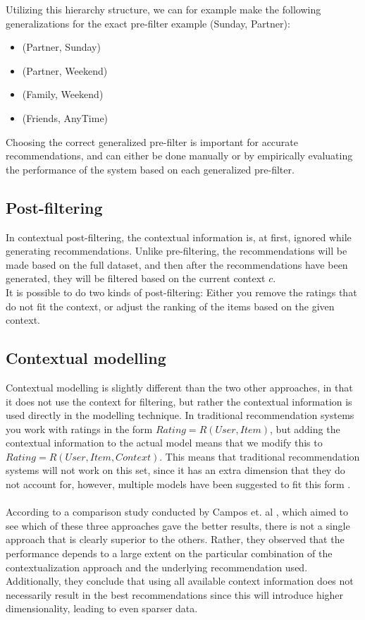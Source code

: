 Utilizing this hierarchy structure, we can for example make the following generalizations for the exact pre-filter example (Sunday, Partner):
\begin{itemize}
	\item (Partner, Sunday)
	\item (Partner, Weekend)
	\item (Family, Weekend)
	\item (Friends, AnyTime)
\end{itemize}

Choosing the correct generalized pre-filter is important for accurate recommendations, and can either be done manually or by empirically evaluating the performance of the system based on each generalized pre-filter.

\subsection*{Post-filtering}
In contextual post-filtering, the contextual information is, at first, ignored while generating recommendations.
Unlike pre-filtering, the recommendations will be made based on the full dataset, and then after the recommendations have been generated, they will be filtered based on the current context $c$.\\
It is possible to do two kinds of post-filtering: Either you remove the ratings that do not fit the context, or adjust the ranking of the items based on the given context.

\subsection*{Contextual modelling}
Contextual modelling is slightly different than the two other approaches, in that it does not use the context for filtering, but rather the contextual information is used directly in the modelling technique.
In traditional recommendation systems you work with ratings in the form $Rating = R(User, Item)$, but adding the contextual information to the actual model means that we modify this to $Rating = R(User, Item, Context)$.
This means that traditional recommendation systems will not work on this set, since it has an extra dimension that they do not account for, however, multiple models have been suggested to fit this form \cite{Adomavicius2011}.\\\\

According to a comparison study conducted by Campos et. al \cite{10.1007/978-3-642-39878-0_13}, which aimed to see which of these three approaches gave the better results, there is not a single approach that is clearly superior to the others.
Rather, they observed that the performance depends to a large extent on the particular combination of the contextualization approach and the underlying recommendation used.\\
Additionally, they conclude that using all available context information does not necessarily result in the best recommendations since this will introduce higher dimensionality, leading to even sparser data.
